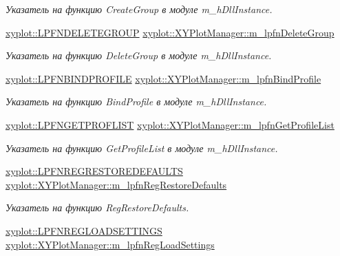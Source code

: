 \begin{DoxyCompactItemize}
\begin{DoxyCompactList}\small\item\em Указатель на функцию Create\-Group в модуле m\-\_\-h\-Dll\-Instance. \end{DoxyCompactList}\item 
\hyperlink{namespacexyplot_a17ee39c2695e1c7c78048d0672744524}{xyplot\-::\-L\-P\-F\-N\-D\-E\-L\-E\-T\-E\-G\-R\-O\-U\-P} \hyperlink{group__gr_func_pointers_ga0503dbf4de0b55a29652e1266f5d6ef4}{xyplot\-::\-X\-Y\-Plot\-Manager\-::m\-\_\-lpfn\-Delete\-Group}
\begin{DoxyCompactList}\small\item\em Указатель на функцию Delete\-Group в модуле m\-\_\-h\-Dll\-Instance. \end{DoxyCompactList}\item 
\hyperlink{namespacexyplot_ae721ca071f1b5292073d3e831c8b1150}{xyplot\-::\-L\-P\-F\-N\-B\-I\-N\-D\-P\-R\-O\-F\-I\-L\-E} \hyperlink{group__gr_func_pointers_gaf868f86e6094025ea6e21f6f0ba4140c}{xyplot\-::\-X\-Y\-Plot\-Manager\-::m\-\_\-lpfn\-Bind\-Profile}
\begin{DoxyCompactList}\small\item\em Указатель на функцию Bind\-Profile в модуле m\-\_\-h\-Dll\-Instance. \end{DoxyCompactList}\item 
\hyperlink{namespacexyplot_a6dfacb1414fefdad54092cb9264eb4b1}{xyplot\-::\-L\-P\-F\-N\-G\-E\-T\-P\-R\-O\-F\-L\-I\-S\-T} \hyperlink{group__gr_func_pointers_ga7e30180703300607ed08653d0a7861eb}{xyplot\-::\-X\-Y\-Plot\-Manager\-::m\-\_\-lpfn\-Get\-Profile\-List}
\begin{DoxyCompactList}\small\item\em Указатель на функцию Get\-Profile\-List в модуле m\-\_\-h\-Dll\-Instance. \end{DoxyCompactList}\item 
\hyperlink{namespacexyplot_a4b16720b36f41b782b9c112b406d9698}{xyplot\-::\-L\-P\-F\-N\-R\-E\-G\-R\-E\-S\-T\-O\-R\-E\-D\-E\-F\-A\-U\-L\-T\-S} \hyperlink{group__gr_func_pointers_ga4eb7d852474ae198afe0c1b67b38d63c}{xyplot\-::\-X\-Y\-Plot\-Manager\-::m\-\_\-lpfn\-Reg\-Restore\-Defaults}
\begin{DoxyCompactList}\small\item\em Указатель на функцию Reg\-Restore\-Defaults. \end{DoxyCompactList}\item 
\hyperlink{namespacexyplot_a2f14b7c1bf6f824f039dd8cafcd19f20}{xyplot\-::\-L\-P\-F\-N\-R\-E\-G\-L\-O\-A\-D\-S\-E\-T\-T\-I\-N\-G\-S} \hyperlink{group__gr_func_pointers_gada86eb509b8fb88edc54dd634a198db6}{xyplot\-::\-X\-Y\-Plot\-Manager\-::m\-\_\-lpfn\-Reg\-Load\-Settings}

\end{DoxyCompactItemize}
